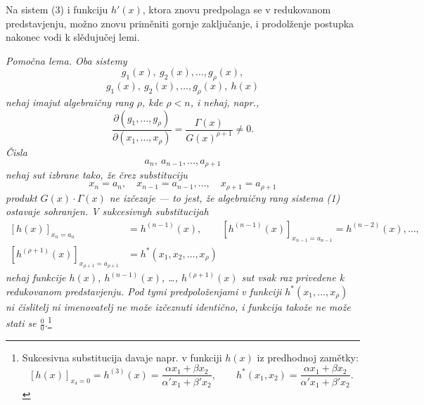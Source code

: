 \documentclass[11pt]{article}
\begin{document}
Na sistem (3) i funkciju $h'(x)$, ktora znovu predpolaga se v redukovanom predstavjenju, možno znovu priměniti gornje zaključanje, i prodolženje postupka nakonec vodi k slědujučej lemi.

{\itshape Pomočna lema. Oba sistemy}
\[
  g_1(x),\ g_2(x),\ldots,g_\rho(x),
\]
\[
  g_1(x),\ g_2(x),\ldots,g_\rho(x),\ h(x)
\]
{\itshape nehaj imajut algebraičny rang $\rho$, kde $\rho<n$, i nehaj, napr.,}
\[
 \frac{\partial(g_1,\ldots,g_\rho)}{\partial(x_1,
\ldots,x_\rho)}
 =\frac{\Gamma(x)}{G(x)^{\rho+1}}\ne0.
\]
{\itshape Čisla}
\[
  a_n,\ a_{n-1},\ldots,a_{\rho+1}
\]
{\itshape nehaj sut izbrane tako, že črez substituciju}
\[
  x_n=a_n,\quad x_{n-1}=a_{n-1},\ldots,\quad x_{\rho+1}=a_{\rho+1}
\]
{\itshape produkt $G(x)\cdot\Gamma(x)$ ne izčezaje --- to jest, že algebraičny rang sistema (1) ostavaje sohranjen. V sukcesivnyh substitucijah}
\[
\begin{aligned}
 [h(x)]_{x_n=a_n}&=h^{(n-1)}(x),\qquad
 [h^{(n-1)}(x)]_{x_{n-1}=a_{n-1}}=h^{(n-2)}(x),\ldots,\\
 [h^{(\rho+1)}(x)]_{x_{\rho+1}=a_{\rho+1}}&=h^*(x_1,x_2,\ldots,x_\rho)
\end{aligned}
\]
{\itshape nehaj funkcije $h(x)$, $h^{(n-1)}(x)$, \ldots, $h^{(\rho+1)}(x)$ sut vsak raz privedene k redukovanom predstavjenju. Pod tymi predpoloženjami v funkciji $h^*(x_1,\ldots,x_\rho)$ ni čislitelj ni imenovatelj ne može izčeznuti identično, i funkcija takože ne može stati se $\frac{0}{0}$.}\footnote{Sukcesivna substitucija davaje napr. v funkciji $h(x)$ iz predhodnoj zamětky:
\[
 [h(x)]_{x_4=0}=h^{(3)}(x)=\frac{\alpha x_1+\beta x_2}{\alpha' x_1+\beta' x_2},\qquad
 h^*(x_1,x_2)=\frac{\alpha x_1+\beta x_2}{\alpha' x_1+\beta' x_2}.
\]}
\end{document}
